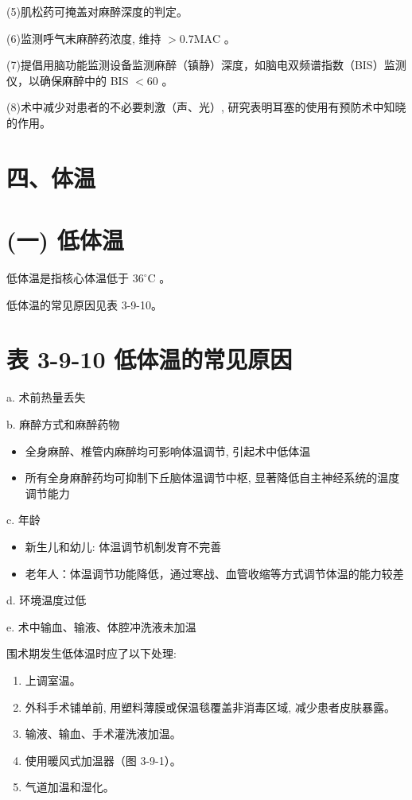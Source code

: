 \documentclass[10pt]{article}
\begin{document}
(5)肌松药可掩盖对麻醉深度的判定。

(6)监测呼气末麻醉药浓度, 维持 $>0.7 \mathrm{MAC}$ 。

(7)提倡用脑功能监测设备监测麻醉（镇静）深度，如脑电双频谱指数（BIS）监测仪，以确保麻醉中的 BIS $<60$ 。

(8)术中减少对患者的不必要刺激（声、光）, 研究表明耳塞的使用有预防术中知晓的作用。

\section*{四、体温}
\section*{(一) 低体温}
低体温是指核心体温低于 $36^{\circ} \mathrm{C}$ 。

低体温的常见原因见表 3-9-10。

\section*{表 3-9-10 低体温的常见原因}
a. 术前热量丢失

b. 麻醉方式和麻醉药物

\begin{itemize}
  \item 全身麻醉、椎管内麻醉均可影响体温调节, 引起术中低体温
  \item 所有全身麻醉药均可抑制下丘脑体温调节中枢, 显著降低自主神经系统的温度调节能力
\end{itemize}

c. 年龄

\begin{itemize}
  \item 新生儿和幼儿: 体温调节机制发育不完善
  \item 老年人：体温调节功能降低，通过寒战、血管收缩等方式调节体温的能力较差
\end{itemize}

d. 环境温度过低

e. 术中输血、输液、体腔冲洗液未加温

围术期发生低体温时应了以下处理:

\begin{enumerate}
  \item 上调室温。

  \item 外科手术铺单前, 用塑料薄膜或保温毯覆盖非消毒区域, 减少患者皮肤暴露。

  \item 输液、输血、手术灌洗液加温。

  \item 使用暖风式加温器（图 3-9-1）。

  \item 气道加温和湿化。

\end{enumerate}
\end{document}
